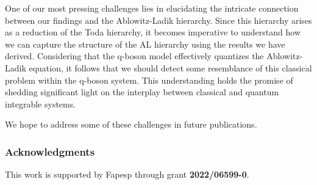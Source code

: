 \documentclass[a4paper,11pt]{amsart}
\begin{document}
One of our most pressing challenges lies in elucidating the intricate
connection between our findings and the Ablowitz-Ladik
hierarchy. Since this hierarchy arises as a reduction of the Toda
hierarchy, it becomes imperative to understand how we can capture the
structure of the AL hierarchy using the results we have derived.
Considering that the q-boson model effectively quantizes the
Ablowitz-Ladik equation, it follows that we should detect some
resemblance of this classical problem within the q-boson system.  This
understanding holds the promise of shedding significant light on the
interplay between classical and quantum integrable systems.

We hope to address some of these challenges in future publications.

\subsubsection*{Acknowledgments}
This work is supported by Fapesp through grant \textbf{2022/06599-0}.

\printbibliography
\end{document}
